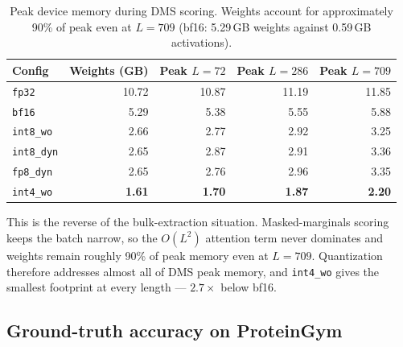 \documentclass[11pt]{article}
\newcommand{\cfg}[1]{\texttt{#1}}
\newcommand{\best}[1]{\textbf{#1}}
\begin{document}
\begin{table}[htb]
\centering
\caption{Peak device memory during DMS scoring. Weights account for
approximately 90\% of peak even at $L=709$ (bf16: 5.29\,GB weights against
0.59\,GB activations).}
\small
\begin{tabular}{lrrrr}
\toprule
Config & Weights (GB) & Peak $L{=}72$ & Peak $L{=}286$ & Peak $L{=}709$ \\
\midrule
\cfg{fp32}      & 10.72 & 10.87 & 11.19 & 11.85 \\
\cfg{bf16}      &  5.29 &  5.38 &  5.55 &  5.88 \\
\cfg{int8\_wo}  &  2.66 &  2.77 &  2.92 &  3.25 \\
\cfg{int8\_dyn} &  2.65 &  2.87 &  2.91 &  3.36 \\
\cfg{fp8\_dyn}  &  2.65 &  2.76 &  2.96 &  3.35 \\
\cfg{int4\_wo}  & \best{1.61} & \best{1.70} & \best{1.87} & \best{2.20} \\
\bottomrule
\end{tabular}
\end{table}

This is the reverse of the bulk-extraction situation. Masked-marginals scoring
keeps the batch narrow, so the $O(L^2)$ attention term never dominates and
weights remain roughly 90\% of peak memory even at $L=709$. Quantization
therefore addresses almost all of DMS peak memory, and \cfg{int4\_wo} gives the
smallest footprint at every length --- $2.7\times$ below bf16.

\subsection{Ground-truth accuracy on ProteinGym}
\label{sec:gt}
\label{sec:gt}
\end{document}
